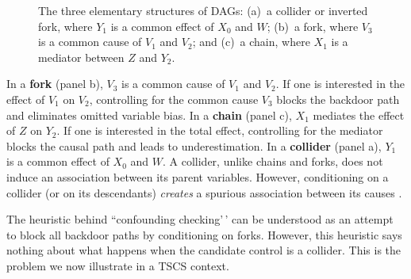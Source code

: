 \documentclass[
]{article}
\begin{document}
\begin{figure}[H]
\centering
{}
\caption{The three elementary structures of DAGs: (a)~a collider or inverted fork, where $Y_1$ is a common effect of $X_0$ and $W$; (b)~a fork, where $V_3$ is a common cause of $V_1$ and $V_2$; and (c)~a chain, where $X_1$ is a mediator between $Z$ and $Y_2$.}
\label{fig:three_structures}
\end{figure}

In a \textbf{fork} (panel b), \(V_3\) is a common cause of \(V_1\) and
\(V_2\). If one is interested in the effect of \(V_1\) on \(V_2\),
controlling for the common cause \(V_3\) blocks the backdoor path and
eliminates omitted variable bias. In a \textbf{chain} (panel c), \(X_1\)
mediates the effect of \(Z\) on \(Y_2\). If one is interested in the
total effect, controlling for the mediator blocks the causal path and
leads to underestimation. In a \textbf{collider} (panel a), \(Y_1\) is a
common effect of \(X_0\) and \(W\). A collider, unlike chains and forks,
does not induce an association between its parent variables. However,
conditioning on a collider (or on its descendants) \emph{creates} a
spurious association between its causes
\citep{elwert2014endogenous, pearl2018book}.

The heuristic behind ``confounding checking'\,' can be understood as an
attempt to block all backdoor paths by conditioning on forks. However,
this heuristic says nothing about what happens when the candidate
control is a collider. This is the problem we now illustrate in a TSCS
context.
\end{document}
